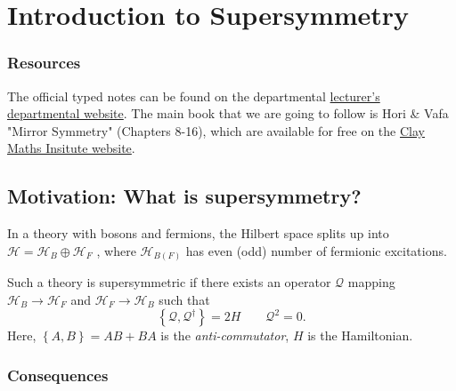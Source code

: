 
\chapter{Introduction to Supersymmetry}%
\label{cha:introduction}

\subsection*{Resources}%

The official typed notes can be found on the departmental \href{http://www.damtp.cam.ac.uk/user/dbs26/SUSY.html}{lecturer's departmental website}. The main book that we are going to follow is Hori \& Vafa "Mirror Symmetry" (Chapters 8-16), which are available for free on the \href{https://www.claymath.org/publications/online-books}{Clay Maths Insitute website}.

\section{Motivation: What is supersymmetry?}%
\label{sec:motivation}

In a theory with bosons and fermions, the Hilbert space splits up into $\mathscr{H} = \mathscr{H}_B \oplus \mathscr{H}_F$ , where $\mathscr{H}_{B(F)}$  has even (odd) number of fermionic excitations.

Such a theory is supersymmetric if there exists an operator $\mathcal{Q}$ mapping $\mathscr{H}_B \to \mathscr{H}_F$  and $\mathscr{H}_F \to \mathscr{H}_B$  such that
\begin{equation}
  \left\{ \mathcal{Q}, \mathcal{Q}^{\dagger} \right\} = 2 H \qquad \mathcal{Q}^2 = 0.
\end{equation}
Here, $\left\{ A, B \right\} = AB + BA$  is the \emph{anti-commutator},  $H$  is the Hamiltonian.

\subsection*{Consequences}%

